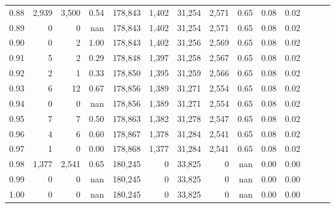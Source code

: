 \begin{tabular}{rrrrrrrrrrrrrr}
0.88 &   2,939 &  3,500 &  0.54 &  178,843 &    1,402 &  31,254 &   2,571 &  0.65 &  0.08 &      0.02 \\
0.89 &       0 &      0 &   nan &  178,843 &    1,402 &  31,254 &   2,571 &  0.65 &  0.08 &      0.02 \\
0.90 &       0 &      2 &  1.00 &  178,843 &    1,402 &  31,256 &   2,569 &  0.65 &  0.08 &      0.02 \\
0.91 &       5 &      2 &  0.29 &  178,848 &    1,397 &  31,258 &   2,567 &  0.65 &  0.08 &      0.02 \\
0.92 &       2 &      1 &  0.33 &  178,850 &    1,395 &  31,259 &   2,566 &  0.65 &  0.08 &      0.02 \\
0.93 &       6 &     12 &  0.67 &  178,856 &    1,389 &  31,271 &   2,554 &  0.65 &  0.08 &      0.02 \\
0.94 &       0 &      0 &   nan &  178,856 &    1,389 &  31,271 &   2,554 &  0.65 &  0.08 &      0.02 \\
0.95 &       7 &      7 &  0.50 &  178,863 &    1,382 &  31,278 &   2,547 &  0.65 &  0.08 &      0.02 \\
0.96 &       4 &      6 &  0.60 &  178,867 &    1,378 &  31,284 &   2,541 &  0.65 &  0.08 &      0.02 \\
0.97 &       1 &      0 &  0.00 &  178,868 &    1,377 &  31,284 &   2,541 &  0.65 &  0.08 &      0.02 \\
0.98 &   1,377 &  2,541 &  0.65 &  180,245 &        0 &  33,825 &       0 &   nan &  0.00 &      0.00 \\
0.99 &       0 &      0 &   nan &  180,245 &        0 &  33,825 &       0 &   nan &  0.00 &      0.00 \\
1.00 &       0 &      0 &   nan &  180,245 &        0 &  33,825 &       0 &   nan &  0.00 &      0.00 \\
\bottomrule
\end{tabular}
